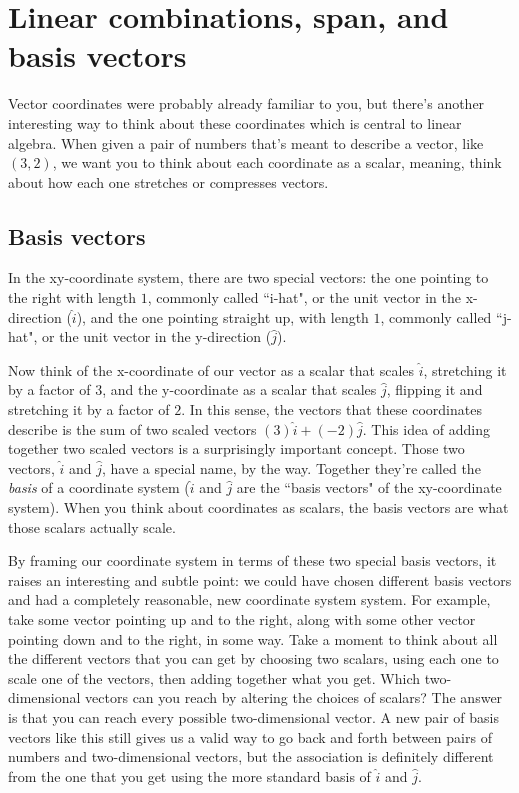\section{Linear combinations, span, and basis vectors}

Vector coordinates were probably already familiar to you, but there's another
interesting way to think about these coordinates which is central to linear
algebra. When given a pair of numbers that's meant to describe a vector, like
$(3, 2)$, we want you to think about each coordinate as a scalar, meaning, think
about how each one stretches or compresses vectors.

\subsection{Basis vectors}

In the xy-coordinate system, there are two special vectors: the one pointing to
the right with length $1$, commonly called ``i-hat", or the unit vector in the
x-direction ($\hat{i}$), and the one pointing straight up, with length $1$,
commonly called ``j-hat", or the unit vector in the y-direction ($\hat{j}$).

Now think of the x-coordinate of our vector as a scalar that scales $\hat{i}$,
stretching it by a factor of $3$, and the y-coordinate as a scalar that scales
$\hat{j}$, flipping it and stretching it by a factor of $2$. In this sense, the
vectors that these coordinates describe is the sum of two scaled vectors
$(3)\hat{i} + (-2)\hat{j}$. This idea of adding together two scaled vectors is a
surprisingly important concept. Those two vectors, $\hat{i}$ and $\hat{j}$, have
a special name, by the way. Together they're called the \textit{basis} of a
coordinate system ($\hat{i}$ and $\hat{j}$ are the ``basis vectors" of the
xy-coordinate system). When you think about coordinates as scalars, the basis
vectors are what those scalars actually scale.

By framing our coordinate system in terms of these two special basis vectors, it
raises an interesting and subtle point: we could have chosen different basis
vectors and had a completely reasonable, new coordinate system system. For
example, take some vector pointing up and to the right, along with some other
vector pointing down and to the right, in some way. Take a moment to think about
all the different vectors that you can get by choosing two scalars, using each
one to scale one of the vectors, then adding together what you get. Which
two-dimensional vectors can you reach by altering the choices of scalars? The
answer is that you can reach every possible two-dimensional vector. A new pair
of basis vectors like this still gives us a valid way to go back and forth
between pairs of numbers and two-dimensional vectors, but the association is
definitely different from the one that you get using the more standard basis of
$\hat{i}$ and $\hat{j}$.

